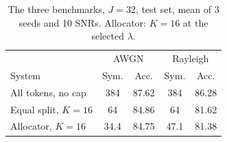 \begin{table}[!t]
  \centering
  \caption{The three benchmarks, $J{=}32$, test set, mean of 3 seeds
           and 10 SNRs. Allocator: $K{=}16$ at the selected $\lambda$.}
  \label{tab:bench}
  \footnotesize
  \setlength{\tabcolsep}{4pt}
  \begin{tabular}{lcccc}
    \toprule
    & \multicolumn{2}{c}{AWGN} & \multicolumn{2}{c}{Rayleigh} \\
    \cmidrule(lr){2-3}\cmidrule(lr){4-5}
    System & Sym. & Acc. & Sym. & Acc. \\
    \midrule
    All tokens, no cap       & 384  & 87.62 & 384  & 86.28 \\
    Equal split, $K{=}16$    & 64   & 84.86 & 64   & 81.62 \\
    Allocator, $K{=}16$      & 34.4 & 84.75 & 47.1 & 81.38 \\
    \bottomrule
  \end{tabular}
\end{table}

\begin{table}[!t]
  \centering
  \caption{Every cap, $J{=}32$, $J_{\max}{=}K/2$, selected $\lambda$:
           symbols and mean accuracy (\%), equal split (Eq.) and
           allocator (Al.).}
  \label{tab:caps}
  \footnotesize
  \setlength{\tabcolsep}{2.5pt}
\end{table}

